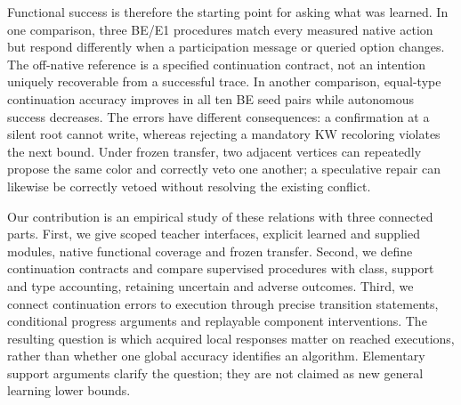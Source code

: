 \documentclass[10pt]{article}
\begin{document}
Functional success is therefore the starting point for asking what was
learned. In one comparison, three BE/E1 procedures match every measured
native action but respond differently when a participation message or queried
option changes. The off-native reference is a specified continuation
contract, not an intention uniquely recoverable from a successful trace.
In another comparison, equal-type continuation accuracy improves in all ten
BE seed pairs while autonomous success decreases. The errors have different
consequences: a confirmation at a silent root cannot write, whereas rejecting
a mandatory KW recoloring violates the next bound. Under frozen transfer,
two adjacent vertices can repeatedly propose the same color and correctly
veto one another; a speculative repair can likewise be correctly vetoed
without resolving the existing conflict.

Our contribution is an empirical study of these relations with three
connected parts. First, we give scoped teacher interfaces, explicit learned
and supplied modules, native functional coverage and frozen transfer.
Second, we define continuation contracts and compare supervised procedures
with class, support and type accounting, retaining uncertain and adverse
outcomes. Third, we connect continuation errors to execution through precise
transition statements, conditional progress arguments and replayable
component interventions. The resulting question is which acquired local
responses matter on reached executions, rather than whether one global
accuracy identifies an algorithm. Elementary support arguments clarify the
question; they are not claimed as new general learning lower bounds.
\end{document}
